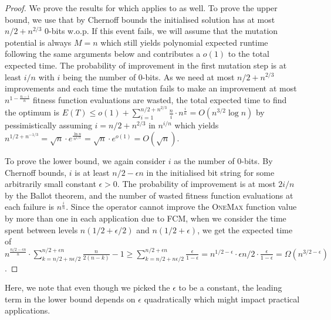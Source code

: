 \documentclass[lettersize,journal]{IEEEtran}
\begin{document}
\begin{proof}
We prove the results for \expoF{} which applies to \expoHD{} as well. 
To prove the upper bound, we use that by Chernoff bounds the initialised solution has at most $n/2+ n^{2/3}$ 0-bits w.o.p. {\color{blue} If this event fails, we will assume that the mutation potential is always $M=n$ which still yields polynomial expected runtime following the same arguments below and contributes a $o(1)$ to the total expected time}. The probability of improvement in the first mutation step is at least $i/n$ with $i$ being the number of 0-bits. As we need at most $n/2+n^{2/3}$ improvements and each time the mutation fails to make an improvement at most $n^{1-\frac{n-i}{n}}$ fitness function evaluations are wasted, the total expected time to find the optimum is $E(T) \leq o(1) + \sum_{i=1}^{n/2+n^{2/3}} \frac{n}{i} \cdot n^{\frac{i}{n}}= O (n^{3/2} \log n)$ by pessimistically assuming $i=n/2+n^{2/3}$ in $n^{i/n}$ {\color{blue} which yields $n^{1/2+n^{-1/3}}=\sqrt{n} \cdot e^{\frac{\ln n}{n^{1/3}}}=\sqrt{n} \cdot e^{o(1)}=O(\sqrt{n})$}.

To prove the lower bound, we again consider $i$ as the number of 0-bits. By Chernoff 
bounds, $i$ is at least $n/2-\epsilon n$  in the initialised bit string for some arbitrarily small constant $\epsilon>0$. 
The probability of improvement is at most $2i/n$ by the Ballot theorem, and the number of wasted fitness function evaluations at each failure is 
$n^{\frac{i}{n}}$. {\color{blue} Since the operator cannot improve the \textsc{OneMax} function value by more than one in each application due to FCM,} when we consider the time spent between levels $n(1/2 + 
\epsilon/2)$ and $n(1/2+\epsilon)$, we get the expected time of 
{\color{blue}$n^{\frac{n/2-\epsilon n}{n}} \cdot \sum_{k=n/2+n\epsilon/2 }^{n/2+\epsilon 
n} \frac{n}{2(n-k)}-1 \geq \sum_{k=n/2+n\epsilon/2 }^{n/2+\epsilon 
n} \frac{\epsilon}{1-\epsilon}=n^{1/2-\epsilon} \cdot \epsilon n/2 \cdot \frac{\epsilon}{1-\epsilon}= 
\Omega(n^{3/2-\epsilon})$.}
\end{proof}

{\color{blue}Here, we note that even though we picked the $\epsilon$ to be a constant, the leading term in the lower bound depends on $\epsilon$ quadratically which might impact practical applications.}



\end{document}
